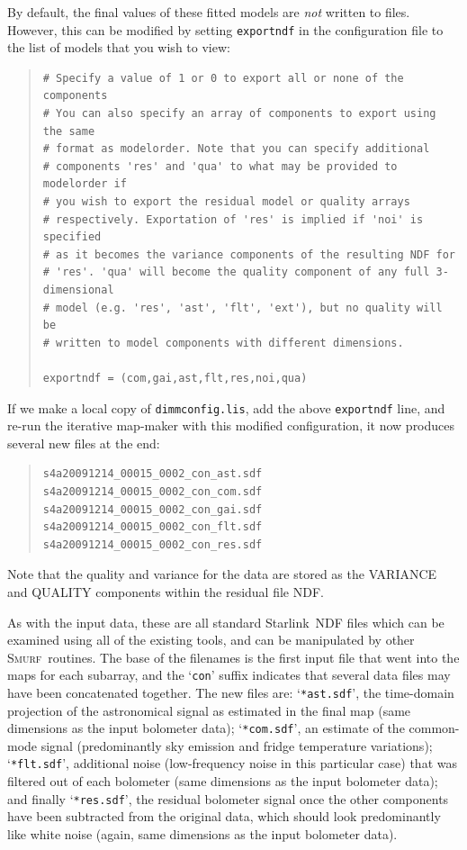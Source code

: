 \documentclass[twoside,11pt]{article}
\newcommand{\htmladdnormallink}[2]{#1}
\newcommand{\xref}[3]{#1}
\renewcommand{\_}{\texttt{\symbol{95}}}
\newenvironment{myquote}{\begin{quote}\begin{small}}{\end{small}\end{quote}}
\newcommand{\starlink}{\htmladdnormallink{Starlink}{http://starlink.jach.hawaii.edu}}
\newcommand{\smurf}{\xref{\textsc{Smurf}}{sun258}{}}
\begin{document}
By default, the final values of these fitted models are {\em not}
written to files. However, this can be modified by setting
\texttt{exportndf} in the configuration file to the list of models
that you wish to view:

\begin{myquote}
\begin{verbatim}
# Specify a value of 1 or 0 to export all or none of the components
# You can also specify an array of components to export using the same
# format as modelorder. Note that you can specify additional
# components 'res' and 'qua' to what may be provided to modelorder if
# you wish to export the residual model or quality arrays
# respectively. Exportation of 'res' is implied if 'noi' is specified
# as it becomes the variance components of the resulting NDF for
# 'res'. 'qua' will become the quality component of any full 3-dimensional
# model (e.g. 'res', 'ast', 'flt', 'ext'), but no quality will be
# written to model components with different dimensions.

exportndf = (com,gai,ast,flt,res,noi,qua)
\end{verbatim}
\end{myquote}

If we make a local copy of \texttt{dimmconfig.lis}, add the above
\texttt{exportndf} line, and re-run the iterative map-maker with this
modified configuration, it now produces several new files at the end:

\begin{myquote}
\begin{verbatim}
s4a20091214_00015_0002_con_ast.sdf
s4a20091214_00015_0002_con_com.sdf
s4a20091214_00015_0002_con_gai.sdf
s4a20091214_00015_0002_con_flt.sdf
s4a20091214_00015_0002_con_res.sdf
\end{verbatim}
\end{myquote}

Note that the quality and variance for the data are stored as the
VARIANCE and QUALITY components within the residual file NDF.

As with the input data, these are all standard \starlink\ NDF files
which can be examined using all of the existing tools, and can be
manipulated by other \smurf\ routines. The base of the filenames is
the first input file that went into the maps for each subarray, and
the `\texttt{con}' suffix indicates that several data files may have
been concatenated together. The new files are: `\texttt{*ast.sdf}',
the time-domain projection of the astronomical signal as estimated in
the final map (same dimensions as the input bolometer data);
`\texttt{*com.sdf}', an estimate of the common-mode signal
(predominantly sky emission and fridge temperature variations);
`\texttt{*flt.sdf}', additional noise (low-frequency noise in this
particular case) that was filtered out of each bolometer (same
dimensions as the input bolometer data); and finally
`\texttt{*res.sdf}', the residual bolometer signal once the other
components have been subtracted from the original data, which should
look predominantly like white noise (again, same dimensions as the
input bolometer data).
\end{document}
